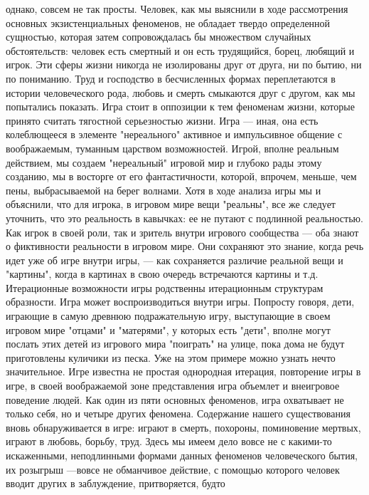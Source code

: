 \documentclass[12pt]{article}
\begin{document}
однако, совсем не так просты. Человек, как мы выяснили в ходе рассмотрения основных экзистенциальных
феноменов,  не  обладает  твердо  определенной  сущностью,  которая  затем  сопровождалась  бы  множеством
случайных обстоятельств: человек есть смертный и он есть трудящийся, борец, любящий и игрок. Эти сферы
жизни  никогда  не  изолированы  друг  от  друга,  ни  по  бытию,  ни  по  пониманию.  Труд  и  господство  в
бесчисленных формах переплетаются в истории человеческого рода, любовь и смерть смыкаются друг с другом,
как  мы  попытались  показать.  Игра  стоит  в  оппозиции  к  тем  феноменам  жизни,  которые  принято  считать
тягостной серьезностью жизни. Игра --- иная, она есть колеблющееся в элементе "нереального" активное и
импульсивное  общение  с  воображаемым,  туманным  царством  возможностей.  Игрой,  вполне  реальным
действием, мы создаем "нереальный" игровой мир и глубоко рады этому созданию, мы в восторге от его
фантастичности, которой, впрочем, меньше, чем пены, выбрасываемой на берег волнами. Хотя в ходе анализа
игры мы и объяснили, что для игрока, в игровом мире вещи "реальны", все же следует уточнить, что это
реальность в кавычках: ее не путают с подлинной реальностью. Как игрок в своей роли, так и зритель внутри
игрового сообщества --- оба знают о фиктивности реальности в игровом мире. Они сохраняют это знание, когда
речь идет уже об игре внутри игры, --- как сохраняется различие реальной вещи и "картины", когда в картинах в
свою  очередь  встречаются  картины  и  т.д.  Итерационные  возможности  игры  родственны  итерационным
структурам образности. Игра может воспроизводиться внутри игры. Попросту говоря, дети, играющие в самую
древнюю подражательную игру, выступающие в своем игровом мире "отцами" и "матерями", у которых есть
"дети",  вполне  могут  послать  этих  детей  из  игрового  мира  "поиграть"  на  улице,  пока  дома  не  будут
приготовлены куличики из песка. Уже на этом примере можно узнать нечто значительное. Игре известна не
простая  однородная  итерация,  повторение  игры  в  игре,  в  своей  воображаемой  зоне  представления  игра
объемлет и внеигровое поведение людей. Как один из пяти основных феноменов, игра охватывает не только
себя, но и четыре других феномена. Содержание нашего существования вновь обнаруживается в игре: играют в
смерть, похороны, поминовение мертвых, играют в любовь, борьбу, труд. Здесь мы имеем дело вовсе не с
какими-то искаженными, неподлинными формами данных феноменов человеческого бытия, их розыгрыш ---вовсе не обманчивое действие, с помощью которого человек вводит других в заблуждение, притворяется, будто
\end{document}

